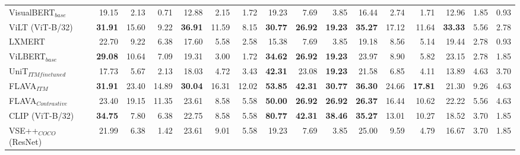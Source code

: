\begin{table}[ht]
\begin{adjustbox}{max width=\textwidth}
\begin{tabular}{l|rrr|rrr|rrr|rrr|rrr}
 VisualBERT$_{base}$          & 19.15          & 2.13           & 0.71           & 12.88          & 2.15           & 1.72           & 19.23          & 7.69           & 3.85           & 16.44          & 2.74           & 1.71           & 12.96          & 1.85           & 0.93           \\
 ViLT (ViT-B/32)              & \textbf{31.91} & 15.60          & 9.22           & \textbf{36.91} & 11.59          & 8.15           & \textbf{30.77} & \textbf{26.92} & \textbf{19.23} & \textbf{35.27} & 17.12          & 11.64          & \textbf{33.33} & 5.56           & 2.78           \\
 LXMERT                       & 22.70          & 9.22           & 6.38           & 17.60          & 5.58           & 2.58           & 15.38          & 7.69           & 3.85           & 19.18          & 8.56           & 5.14           & 19.44          & 2.78           & 0.93           \\
 ViLBERT$_{base}$             & \textbf{29.08} & 10.64          & 7.09           & 19.31          & 3.00           & 1.72           & \textbf{34.62} & \textbf{26.92} & \textbf{19.23} & 23.97          & 8.90           & 5.82           & 23.15          & 2.78           & 1.85           \\
 UniT$_{ITM finetuned}$       & 17.73          & 5.67           & 2.13           & 18.03          & 4.72           & 3.43           & \textbf{42.31} & 23.08          & \textbf{19.23} & 21.58          & 6.85           & 4.11           & 13.89          & 4.63           & 3.70           \\
  FLAVA$_{ITM}$                & \textbf{31.91} & 23.40 & 14.89 & \textbf{30.04} & 16.31 & 12.02 & \textbf{53.85} & \textbf{42.31} & \textbf{30.77} & \textbf{36.30} & 24.66 & \textbf{17.81} & 21.30          & 9.26 & 4.63 \\
 FLAVA$_{Contrastive}$        & 23.40          & 19.15 & 11.35 & 23.61          &  8.58 &  5.58 & \textbf{50.00} & \textbf{26.92} & \textbf{26.92} & \textbf{26.37} & 16.44 & 10.62          & 22.22          &  5.56 & 4.63 \\
 CLIP (ViT-B/32)              & \textbf{34.75} & 7.80           & 6.38           & 22.75          & 8.58           & 5.58           & \textbf{80.77} & \textbf{42.31} & \textbf{38.46} & \textbf{35.27} & 13.01          & 10.27          & 18.52          & 3.70           & 1.85           \\
 VSE++$_{COCO}$ (ResNet)      & 21.99          & 6.38           & 1.42           & 23.61          & 9.01           & 5.58           & 19.23          & 7.69           & 3.85           & 25.00          & 9.59           & 4.79           & 16.67          & 3.70           & 1.85           \\

\end{tabular}
\end{adjustbox}
\end{table}

